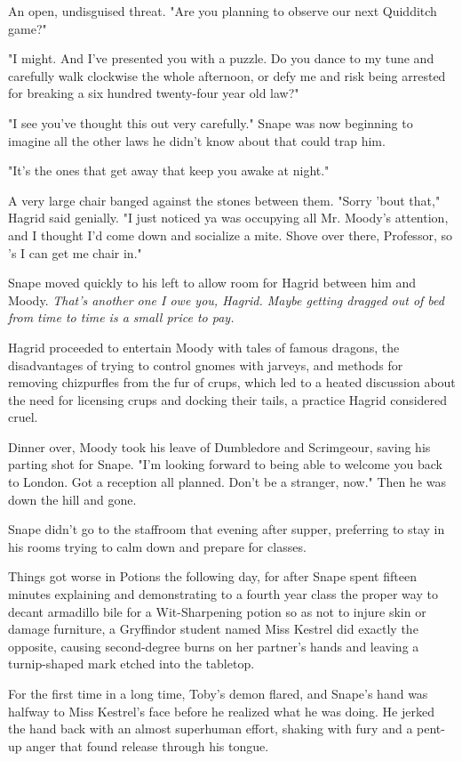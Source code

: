 An open, undisguised threat. "Are you planning to observe our next Quidditch game?"

"I might. And I've presented you with a puzzle. Do you dance to my tune and carefully walk clockwise the whole afternoon, or defy me and risk being arrested for breaking a six hundred twenty-four year old law?"

"I see you've thought this out very carefully." Snape was now beginning to imagine all the other laws he didn't know about that could trap him.

"It's the ones that get away that keep you awake at night."

A very large chair banged against the stones between them. "Sorry 'bout that," Hagrid said genially. "I just noticed ya was occupying all Mr. Moody's attention, and I thought I'd come down and socialize a mite. Shove over there, Professor, so 's I can get me chair in."

Snape moved quickly to his left to allow room for Hagrid between him and Moody. \emph{That's another one I owe you, Hagrid. Maybe getting dragged out of bed from time to time is a small price to pay.}

Hagrid proceeded to entertain Moody with tales of famous dragons, the disadvantages of trying to control gnomes with jarveys, and methods for removing chizpurfles from the fur of crups, which led to a heated discussion about the need for licensing crups and docking their tails, a practice Hagrid considered cruel.

Dinner over, Moody took his leave of Dumbledore and Scrimgeour, saving his parting shot for Snape. "I'm looking forward to being able to welcome you back to London. Got a reception all planned. Don't be a stranger, now." Then he was down the hill and gone.

Snape didn't go to the staffroom that evening after supper, preferring to stay in his rooms trying to calm down and prepare for classes.

Things got worse in Potions the following day, for after Snape spent fifteen minutes explaining and demonstrating to a fourth year class the proper way to decant armadillo bile for a Wit-Sharpening potion so as not to injure skin or damage furniture, a Gryffindor student named Miss Kestrel did exactly the opposite, causing second-degree burns on her partner's hands and leaving a turnip-shaped mark etched into the tabletop.

For the first time in a long time, Toby's demon flared, and Snape's hand was halfway to Miss Kestrel's face before he realized what he was doing. He jerked the hand back with an almost superhuman effort, shaking with fury and a pent-up anger that found release through his tongue.

